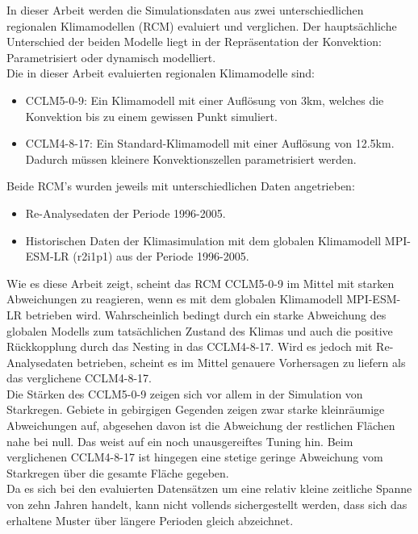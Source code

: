 In dieser Arbeit werden die Simulationsdaten aus zwei unterschiedlichen regionalen Klimamodellen (RCM) evaluiert und verglichen. Der hauptsächliche Unterschied der beiden Modelle liegt in der Repräsentation der Konvektion: Parametrisiert oder dynamisch modelliert.\\

Die in dieser Arbeit evaluierten regionalen Klimamodelle sind:
\begin{itemize}
	\item CCLM5-0-9: Ein Klimamodell mit einer Auflösung von 3km, welches die Konvektion bis zu einem gewissen Punkt simuliert.
	\item CCLM4-8-17: Ein Standard-Klimamodell mit einer Auflösung von 12.5km. Dadurch müssen kleinere Konvektionszellen parametrisiert werden. 
\end{itemize}
Beide RCM's wurden jeweils mit unterschiedlichen Daten angetrieben: 
\begin{itemize}
	\item Re-Analysedaten der Periode 1996-2005.
	\item Historischen Daten der Klimasimulation mit dem globalen Klimamodell MPI-ESM-LR (r2i1p1) \cite{mpi-esm-lr} aus der Periode 1996-2005.
\end{itemize}
Wie es diese Arbeit zeigt, scheint das RCM CCLM5-0-9 im Mittel mit starken Abweichungen zu reagieren, wenn es mit dem globalen Klimamodell MPI-ESM-LR betrieben wird. Wahrscheinlich bedingt durch ein starke Abweichung des globalen Modells zum tatsächlichen Zustand des Klimas und auch die positive Rückkopplung durch das Nesting in das CCLM4-8-17. Wird es jedoch mit Re-Analysedaten betrieben, scheint es im Mittel genauere Vorhersagen zu liefern als das verglichene CCLM4-8-17.\\
Die Stärken des CCLM5-0-9 zeigen sich vor allem in der Simulation von Starkregen. Gebiete in gebirgigen Gegenden zeigen zwar starke kleinräumige Abweichungen auf, abgesehen davon ist die Abweichung der restlichen Flächen nahe bei null. Das weist auf ein noch unausgereiftes Tuning hin. Beim verglichenen CCLM4-8-17 ist hingegen eine stetige geringe Abweichung vom Starkregen über die gesamte Fläche gegeben.\\
Da es sich bei den evaluierten Datensätzen um eine relativ kleine zeitliche Spanne von zehn Jahren handelt, kann nicht vollends sichergestellt werden, dass sich das erhaltene Muster über längere Perioden gleich abzeichnet.